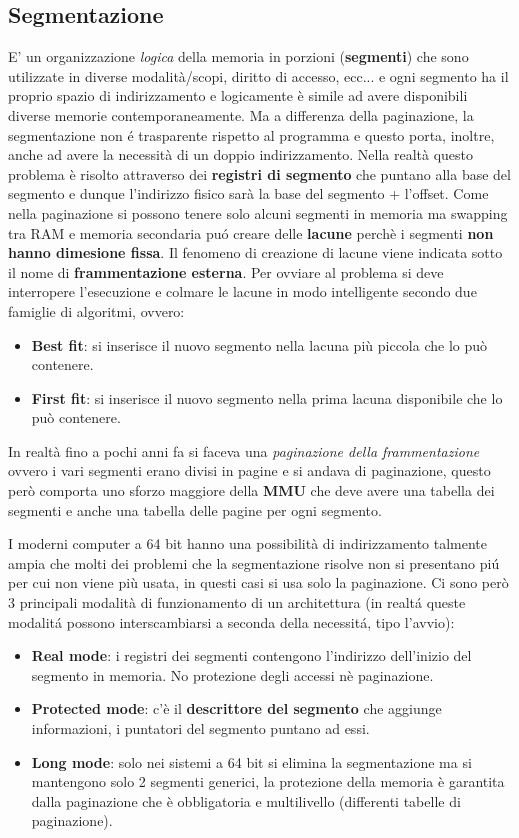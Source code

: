 \documentclass{article}
\begin{document}
\subsection{Segmentazione}
E' un organizzazione \textit{logica} della memoria in porzioni (\textbf{segmenti}) che sono utilizzate in diverse modalità/scopi, diritto di accesso, ecc... e ogni segmento ha il proprio spazio di indirizzamento e logicamente è simile ad avere disponibili diverse memorie contemporaneamente. Ma a differenza della paginazione, la segmentazione non é trasparente rispetto al programma e questo porta, inoltre, anche ad avere la necessità di un doppio indirizzamento. Nella realtà questo problema è risolto attraverso dei \textbf{registri di segmento} che puntano alla base del segmento e dunque l'indirizzo fisico sarà la base del segmento + l'offset. Come nella paginazione si possono tenere solo alcuni segmenti in memoria ma swapping tra RAM e memoria secondaria puó creare delle \textbf{lacune} perchè i segmenti \textbf{non hanno dimesione fissa}. Il fenomeno di creazione di lacune viene indicata sotto il nome di \textbf{frammentazione esterna}. Per ovviare al problema si deve interropere l'esecuzione e colmare le lacune in modo intelligente secondo due famiglie di algoritmi, ovvero: \begin{itemize}
    \item \textbf{Best fit}: si inserisce il nuovo segmento nella lacuna più piccola che lo può contenere.
    \item \textbf{First fit}: si inserisce il nuovo segmento nella prima lacuna disponibile che lo può contenere.
\end{itemize} 
In realtà fino a pochi anni fa si faceva una \textit{paginazione della frammentazione} ovvero i vari segmenti erano divisi in pagine e si andava di paginazione, questo però comporta uno sforzo maggiore della \textbf{MMU} che deve avere una tabella dei segmenti e anche una tabella delle pagine per ogni segmento.

I moderni computer a 64 bit hanno una possibilità di indirizzamento talmente ampia che molti dei problemi che la segmentazione risolve non si presentano piú per cui non viene più usata, in questi casi si usa solo la paginazione.
Ci sono però 3 principali modalità di funzionamento di un architettura (in realtá queste modalitá possono interscambiarsi a seconda della necessitá, tipo l'avvio): \begin{itemize}
    \item  \textbf{Real mode}: i registri dei segmenti contengono l'indirizzo dell'inizio del segmento in memoria. No protezione degli accessi nè paginazione.
    \item \textbf{Protected mode}: c'è il \textbf{descrittore del segmento} che aggiunge informazioni, i puntatori del segmento puntano ad essi.
    \item \textbf{Long mode}: solo nei sistemi a 64 bit si elimina la segmentazione ma si mantengono solo 2 segmenti generici, la protezione della memoria è garantita dalla paginazione che è obbligatoria e multilivello (differenti tabelle di paginazione).
\end{itemize}
\end{document}
